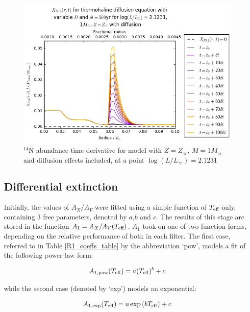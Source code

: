 \documentclass[usenatbib]{mnras}
\begin{document}
\begin{figure}
\begin{center}
\includegraphics[scale=0.4]{../mu_test_data/mu_test_graphs/eq_logL=2p1231_time_diff_eq_Dvar_10dt_dmu_k_lim.png}
\caption{$^{14}$N abundance time derivative for model with $Z = Z_{\sun}$, $M = 1M_{\sun}$ and diffusion effects included, at a point $\log(L/L_{\sun}) = 2.1231$}
\label{dXN14/dt_colour}
\end{center}
\end{figure}

\subsection{Differential extinction}
Initially, the values of $A_{X}/A_{V}$ were fitted using a simple function of $T_{\textnormal{eff}}$ only, containing 3 free parameters, denoted by $a$,$b$ and $c$. The results of this stage are stored in the function $A_{1} = A_{X}/A_{V}(T_{\textnormal{eff}})$. $A_{1}$ took on one of two function forms, depending on the relative performance of both in each filter. The first case, referred to in Table \ref{R1_coeffs_table} by the abbreviation `pow', models a fit of the following power-law form:

\begin{equation}
A_{1,\textnormal{pow}} (T_{\textnormal{eff}}) = a (T_{\textnormal{eff}})^{b} + c
\label{Teff_pow}
\end{equation}

while the second case (denoted by `exp') models an exponential:

\begin{equation}
A_{1,\textnormal{exp}} (T_{\textnormal{eff}}) = a \exp{(b T_{\textnormal{eff}})} + c
\label{Teff_exp}
\end{equation}
\end{document}
